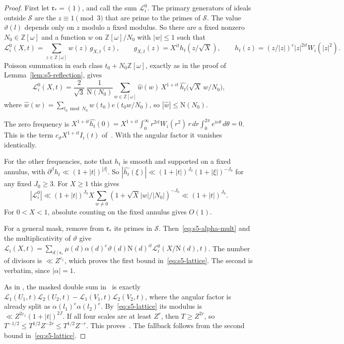 \documentclass[11pt]{article}
\numberwithin{equation}{section}
\newcommand{\OO}{\mathbb Z[\omega]}
\newcommand{\N}{\mathrm N}
\begin{document}
\begin{proof}
First let $\mathfrak r_*=(1)$, and call the sum $\mathcal L_i^0$. The primary generators of ideals outside
$\mathcal S$ are the $z\equiv1\pmod3$ that are prime to the primes of $\mathcal S$. The value $\vartheta(l)$
depends only on $z$ modulo a fixed modulus. So there are a fixed nonzero $N_0\in\OO$ and a function $w$ on
$\OO/N_0$ with $|w|\le1$ such that
\begin{equation}\label{eq:d184}
 \mathcal L_i^0(X,t)=\sum_{z\in\OO}w(z)\,g_{X,t}(z),\qquad
 g_{X,t}(z)=X^{it}h_t(z/\sqrt X),\qquad h_t(z)=(z/|z|)^e|z|^{2it}W_i(|z|^2).
\end{equation}
Poisson summation in each class $t_0+N_0\OO$, exactly as in the proof of Lemma~\ref{lem:s5-reflection},
gives
\begin{equation}\label{eq:d185}
 \mathcal L_i^0(X,t)=\frac2{\sqrt3}\,\frac1{\N(N_0)}\sum_{w\in\OO}\widehat w(w)\,X^{1+it}\,
 \widehat{h_t}\bigl(\sqrt X\,w/N_0\bigr),
\end{equation}
where $\widehat w(w)=\sum_{t_0\bmod N_0}w(t_0)e(t_0w/N_0)$, so $|\widehat w|\le\N(N_0)$.

The zero frequency is
$X^{1+it}\widehat{h_t}(0)=X^{1+it}\int_0^\infty r^{2it}W_i(r^2)\,r\,dr\int_0^{2\pi}e^{ie\theta}\,d\theta=0$.
This is the term $c_\vartheta X^{1+it}I_i(t)$ of~\cite{OAI78}. With the angular factor it vanishes
identically.

For the other frequencies, note that $h_t$ is smooth and supported on a fixed annulus, with
$\partial^\beta h_t\ll(1+|t|)^{|\beta|}$. So $|\widehat{h_t}(\xi)|\ll(1+|t|)^{J_0}(1+|\xi|)^{-J_0}$ for any
fixed $J_0\ge3$. For $X\ge1$ this gives
\begin{equation}\label{eq:d186}
 |\mathcal L_i^0|\ll(1+|t|)^{J_0}X\sum_{w\ne0}(1+\sqrt X|w|/|N_0|)^{-J_0}\ll(1+|t|)^{J_0}.
\end{equation}
For $0<X<1$, absolute counting on the fixed annulus gives $O(1)$.

For a general mask, remove from $\mathfrak r_*$ its primes in $\mathcal S$. Then~\eqref{eq:s5-alpha-mult}
and the multiplicativity of $\vartheta$ give
$\mathcal L_i(X,t)=\sum_{d\mid\mathfrak r_*}\mu(d)\alpha(d)^e\vartheta(d)\N(d)^{it}\mathcal L_i^0(X/\N(d),t)$.
The number of divisors is $\ll Z^{\varepsilon_1}$, which proves the first bound
in~\eqref{eq:s5-lattice}. The second is \cite[proof of Lemma~18.3]{OAI78} verbatim, since $|\alpha|=1$.

As in \cite[proof of Lemma~18.3]{OAI78}, the masked double sum in~\cite[eq.~(18.47)]{OAI78} is exactly
$\mathcal L_1(U_1,t)\mathcal L_2(U_2,t)-\mathcal L_1(V_1,t)\mathcal L_2(V_2,t)$, where the angular factor
is already split as $\alpha(l_1)^e\alpha(l_2)^e$. By~\eqref{eq:s5-lattice} its modulus is
$\ll Z^{2\varepsilon_1}(1+|t|)^{2J}$. If all four scales are at least $Z^r$, then $T\ge Z^{2r}$, so
$T^{-1/2}\le T^{1/2}Z^{-2r}\le T^{1/2}Z^{-r}$. This proves~\cite[eq.~(18.47)]{OAI78}. The fallback
follows from the second bound in~\eqref{eq:s5-lattice}.
\end{proof}
\end{document}
